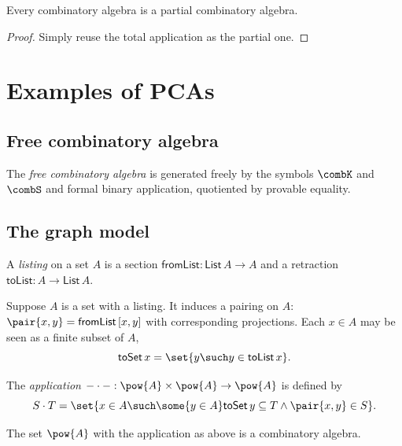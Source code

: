 \begin{proposition}
  \label{prop:CAisPCA}
  \leanok
  Every combinatory algebra is a partial combinatory algebra.
\end{proposition}

\begin{proof}
  \leanok
  Simply reuse the total application as the partial one.
\end{proof}

\section{Examples of PCAs}

\subsection{Free combinatory algebra}
\label{sec:freeCA}

\begin{definition}
  \label{def:FreeCA}
  \leanok
  The \emph{free combinatory algebra} is generated freely by the symbols $\combK$ and $\combS$ and formal binary application, quotiented by provable equality.
\end{definition}

\subsection{The graph model}
\label{sec:graph-model}

\begin{definition}
  \label{def:Listing}
  \leanok
  A \emph{listing} on a set $A$ is a section $\mathsf{fromList} : \mathsf{List}\,A \to A$ and a retraction $\mathsf{toList} : A \to \mathsf{List}\,A$.
\end{definition}

Suppose $A$ is a set with a listing. It induces a pairing on $A$: $\pair{x, y} = \mathsf{fromList}\,[x,y]$ with corresponding projections. Each $x \in A$ may be seen as a finite subset of $A$,
%
\begin{equation*}
  \mathsf{toSet}\,x = \set{y \such y \in \mathsf{toList}\,x}.
\end{equation*}


\begin{definition}
  \label{def:graph-model-application}
  \leanok
  The \emph{application} ${-} \cdot {-} : \pow{A} \times \pow{A} \to \pow{A}$ is defined by
  \begin{equation*}
    S \cdot T = \set{x \in A \such \some{y \in A} \mathsf{toSet}\,y \subseteq T \land \pair{x,y} \in S}.
  \end{equation*}
\end{definition}

\begin{theorem}
  \label{thm:graph-model}
  \leanok
  The set $\pow{A}$ with the application as above is a combinatory algebra.
\end{theorem}



